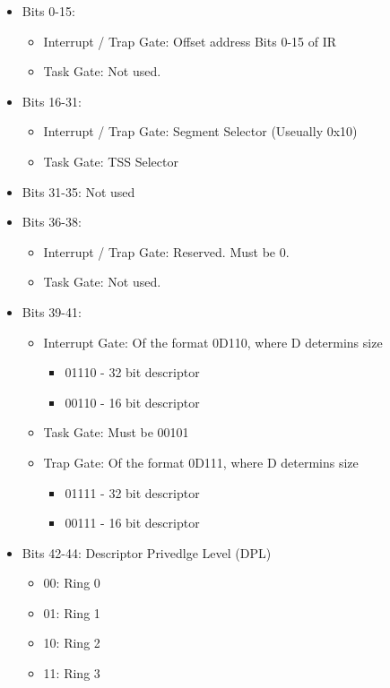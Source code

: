 \documentclass[document.tex]{subfiles}
\begin{document}
\begin{english}

\begin{itemize}
\item Bits 0-15:
\begin{itemize}
\item Interrupt / Trap Gate: Offset address Bits 0-15 of IR
\item Task Gate: Not used. 
\end{itemize}

\item Bits 16-31:
\begin{itemize}
\item Interrupt / Trap Gate: Segment Selector (Useually 0x10)
\item Task Gate: TSS Selector
\end{itemize}

\item Bits 31-35: Not used
\item Bits 36-38:
\begin{itemize}
\item Interrupt / Trap Gate: Reserved. Must be 0.
\item Task Gate: Not used.
\end{itemize}

\item Bits 39-41:
\begin{itemize}
\item Interrupt Gate: Of the format 0D110, where D determins size
\begin{itemize}
\item 01110 - 32 bit descriptor
\item 00110 - 16 bit descriptor
\end{itemize}
\item Task Gate: Must be 00101
\item Trap Gate: Of the format 0D111, where D determins size
\begin{itemize}
\item 01111 - 32 bit descriptor
\item 00111 - 16 bit descriptor
\end{itemize}

\end{itemize}

\item Bits 42-44: Descriptor Privedlge Level (DPL)
\begin{itemize}
\item 00: Ring 0
\item 01: Ring 1
\item 10: Ring 2
\item 11: Ring 3
\end{itemize}


\end{itemize}
\end{english}
\end{document}
